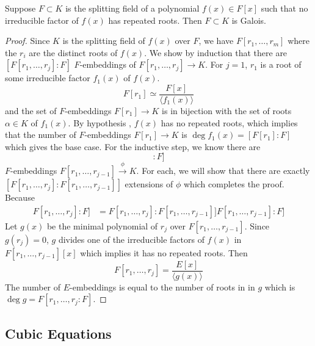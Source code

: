   \begin{theorem}[Shifrin 6.8]
    Suppose $F \subset K$ is the splitting field of a polynomial $f(x) \in F[x]$ such that no irreducible factor of $f(x)$ has repeated roots. Then $F \subset K$ is Galois. 
  \end{theorem}
  \begin{proof}
    Since $K$ is the splitting field of $f(x)$ over $F$, we have $F[r_1, \ldots, r_m]$ where the $r_i$ are the distinct roots of $f(x)$. We show by induction that there are $[F[r_1, \ldots, r_j]:F]$ $F$-embeddings of $F[r_1, \ldots, r_j] \to K$. For $j = 1$, $r_1$ is a root of some irreducible factor $f_1 (x)$ of $f(x)$. 
    \begin{equation}
      F[r_1] \simeq \frac{F[x]}{\langle f_1 (x) \rangle}
    \end{equation} 
    and the set of $F$-embeddings $F[r_1] \to K$ is in bijection with the set of roots $\alpha \in K$ of $f_1 (x)$. By hypothesis , $f(x)$ has no repeated roots, which implies that the number of $F$-embeddings $F[r_1] \to K$ is $\deg{f_1 (x)} = [F[r_1]: F]$ which gives the base case. For the inductive step, we know there are 
    \begin{equation}
      [F[r_1, \ldots, r_{j-1}]: F] 
    \end{equation}
    $F$-embeddings $F[r_1, \ldots, r_{j-1}] \xrightarrow{\phi} K$. For each, we will show that there are exactly $[F[r_1, \ldots, r_j]: F[r_1, \ldots, r_{j-1}]]$ extensions of $\phi$ which completes the proof. Because 
    \begin{align}
      F[r_1, \ldots, r_j]: F] & = F[r_1, \ldots, r_j]: F[r_1, \ldots, r_{j-1}]] F[r_1, \ldots, r_{j-1}]: F]
    \end{align} 
    Let $g(x)$ be the minimal polynomial of $r_j$ over $F[r_1, \ldots, r_{j-1}]$. Since $g(r_j) = 0$, $g$ divides one of the irreducible factors of $f(x)$ in $F[r_1, \ldots, r_{j-1}] [x]$ which implies it has no repeated roots. Then 
    \begin{equation}
      F[r_1, \ldots, r_j] = \frac{E[x]}{\langle g(x)\rangle} 
    \end{equation}
    The number of $E$-embeddings is equal to the number of roots in in $g$ which is $\deg{g} = F[r_1, \ldots, r_j: F]$.
  \end{proof}

\subsection{Cubic Equations}

